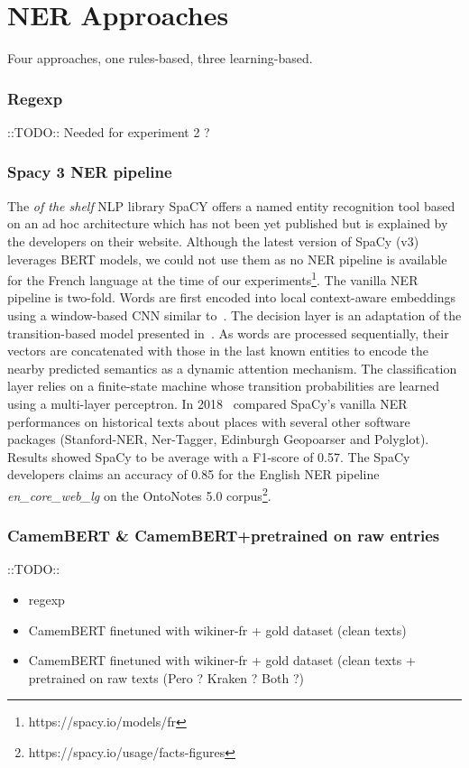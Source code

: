 \section{NER Approaches}
Four approaches, one rules-based, three learning-based.

\subsubsection{Regexp}
::TODO::
Needed for experiment 2 ?

\subsubsection{Spacy 3 NER pipeline}
The \textit{of the shelf} NLP library SpaCY offers a named entity recognition tool based on an ad hoc architecture which has not been yet published but is explained by the developers on their website. Although the latest version of SpaCy (v3) leverages BERT models, we could not use them as no NER pipeline is available for the French language at the time of our experiments\footnote{https://spacy.io/models/fr}. The vanilla NER pipeline is two-fold. Words are first encoded into local context-aware embeddings using a window-based CNN similar to~\cite{collobert2011}. The decision layer is an adaptation of the transition-based model presented in~\cite{lample2016}. As words are processed sequentially, their vectors are concatenated with those in the last known entities to encode the nearby predicted semantics as a dynamic attention mechanism. The classification layer relies on a finite-state machine whose transition probabilities are learned using a multi-layer perceptron.
In 2018~\cite{won2018} compared SpaCy's vanilla NER performances on historical texts about places with several other software packages (Stanford-NER, Ner-Tagger, Edinburgh Geopoarser and Polyglot). Results showed SpaCy to be average with a F1-score of 0.57. The SpaCy developers claims an accuracy of 0.85 for the English NER pipeline \textit{en\_core\_web\_lg} on the OntoNotes 5.0 corpus\footnote{https://spacy.io/usage/facts-figures}.

\subsubsection{CamemBERT \& CamemBERT+pretrained on raw entries}
::TODO::

\begin{itemize}
    \item regexp
    \item CamemBERT finetuned with wikiner-fr + gold dataset (clean texts)
    \item CamemBERT finetuned with wikiner-fr + gold dataset (clean texts + pretrained on raw texts (Pero ? Kraken ? Both ?)
\end{itemize}


